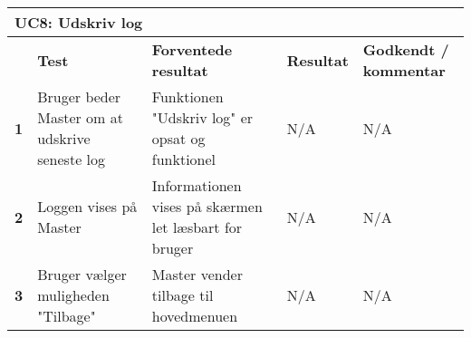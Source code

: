
\begin{longtable}{|p{5mm}|p{40mm}|p{40mm}|p{20mm}|p{25mm}|}
\hline 
\multicolumn{5}{|l|}{\textbf{UC8: Udskriv log}} \\ 
\hline 
& \textbf{Test}&\textbf{Forventede resultat}& \textbf{Resultat} & \textbf{Godkendt / kommentar} \\ 
\hline 
\textbf{1}& Bruger beder Master om at udskrive seneste log & Funktionen "Udskriv log" er opsat og funktionel & N/A & N/A \\ 
\hline 
\textbf{2}& Loggen vises på Master & Informationen vises på skærmen let læsbart for bruger & N/A & N/A \\ 
\hline 
\textbf{3}& Bruger vælger muligheden "Tilbage" & Master vender tilbage til hovedmenuen & N/A & N/A \\ 
\hline  
\end{longtable} 